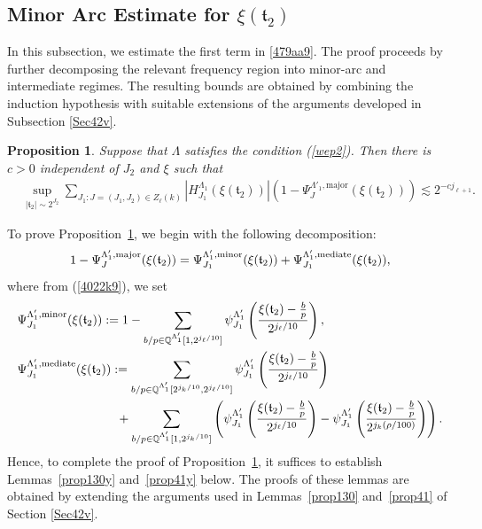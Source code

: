 \documentclass[11 pt,letterpaper]{amsart}
\theoremstyle{plain}
\newtheorem{proposition}{Proposition}\numberwithin{proposition}{section}
\theoremstyle{definition}
\theoremstyle{remark} \theoremstyle{exam} \theoremstyle{ob}
\numberwithin{equation}{section}
\begin{document}
\subsection{Minor Arc Estimate for $\xi(\mathfrak{t}_2)$}\label{sec5.1}
In this subsection, we estimate the first term in \eqref{479aa9}. The proof proceeds by further decomposing the relevant frequency region into minor-arc and intermediate regimes. The resulting bounds are obtained by combining the induction hypothesis with suitable extensions of the arguments developed in  Subsection \ref{Sec42v}.


\begin{proposition}\label{prop419b9}
Suppose that $\Lambda$ satisfies   the  condition (\ref{wep2}). Then
there is $c>0$  independent of $J_2$ and $\xi$ such that
\begin{align*}
&\sup_{|\mathfrak{t}_2|\sim 2^{J_2}}\sum_{J_1: J=(J_1,J_2)\in Z_\ell(k)}   |H^{\Lambda_{1}}_{J_1}( \xi(\mathfrak{t}_2))|  \left(1-\Psi_{J}^{\Lambda'_1,\mathrm{major}}(\xi(\mathfrak{t}_2))  \right) \lesssim 2^{-cj_{\ell+1}}.
\end{align*}
\end{proposition} 


To prove Proposition~\ref{prop419b9}, we begin with the following decomposition: 
$$1-\Psi_{J}^{\Lambda'_1,\mathrm{major}}(\xi(\mathfrak{t}_2))=\Psi^{\Lambda'_1,\rm{minor}}_{J_1}(\xi(\mathfrak{t}_2)) +
\Psi^{\Lambda'_1,\rm{mediate}}_{J_1}(\xi(\mathfrak{t}_2)),$$
where  from (\ref{4022k9}), we set
\begin{align*} 
&\Psi^{\Lambda'_1,\rm{minor}}_{J_1}(\xi(\mathfrak{t}_2)) :=1 -\sum_{b/p\in  \mathbb{Q}^{\Lambda'_1}[1,2^{j_{\ell}/10}]}\psi^{\Lambda'_1}_{J_1}\left(\frac{\xi(\mathfrak{t}_2)-\frac{b}{p}}{2^{j_{\ell}/10}}\right),\nonumber \\
&\Psi^{\Lambda'_1,\rm{mediate}}_{J_1}(\xi(\mathfrak{t}_2)):=\sum_{b/p\in  \mathbb{Q}^{\Lambda'_1}[2^{j_{k}/10},2^{j_{\ell}/10}]}\psi^{\Lambda_1'}_{J_1}\left(\frac{\xi(\mathfrak{t}_2)-\frac{b}{p}}{2^{j_{\ell}/10}}\right)  \\
&\qquad\quad\qquad\qquad\quad+
\sum_{b/p\in  \mathbb{Q}^{\Lambda'_1}[1,2^{j_k/10}]}
 \left( \psi^{\Lambda'_1}_{J_1}\left(\frac{\xi(\mathfrak{t}_2)-\frac{b}{p}}{2^{j_{\ell}/10}}\right)-\psi^{\Lambda'_1}_{J_1}\left(\frac{\xi(\mathfrak{t}_2)-\frac{b}{p}}{2^{j_{k}(\rho/100)}}\right) \right).\nonumber
    \end{align*}
 Hence, to complete the proof of Proposition~\ref{prop419b9}, it suffices to
establish Lemmas~\ref{prop130y} and~\ref{prop41y} below.  
The proofs of these lemmas are obtained by extending
the arguments used in Lemmas~\ref{prop130} and~\ref{prop41} of Section \ref{Sec42v}.
\end{document}
